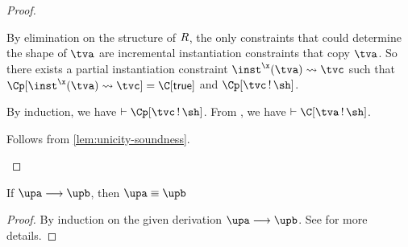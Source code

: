 \documentclass[acmsmall,screen,nonacm%
\Anonymous{,anonymous}{}%
\Final{}{,review}%
]{acmart}
\newcommand{\BBemlti}{Pottier-Remy/emlti}
\begin{document}
\begin{lemma}
\begin{proof}
\begin{proofcases}
\begin{proofcases}
            By elimination on the structure of $R$, the only constraints that
            could determine the shape of $\tv$ are incremental instantiation
            constraints that copy $\tv$. So there exists a partial
            instantiation constraint $\cpapp \x \tv \tvc \inst$ such that $\Cp
            \where{\cpapp \x \tv \tvc \inst} = \C\where{\ctrue}$ and $\Cshape
            \Cp \tvc \sh$.

            By induction, we have $\th \Cshape \Cp \tvc \sh$. From
            , we have $\th \Cshape \C \tv \sh$.


        \end{proofcases}

      \proofcase{$\impliedby$} Follows from \cref{lem:unicity-soundness}.

    \end{proofcases}

  \end{proof}
\end{lemma}

\begin{lemma}
  \label{lem:unification-preservation}
  If $\upa \unif \upb$, then $\upa \equiv \upb$
  \begin{proof}
    By induction on the given derivation $\upa \unif \upb$.
    See \citet*{\BBemlti} for more details.
  \end{proof}
\end{lemma}
\end{document}
